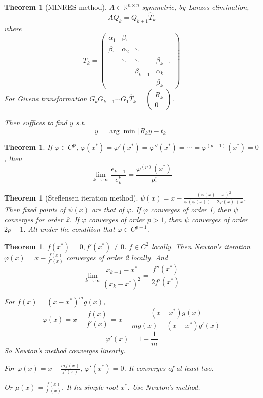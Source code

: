 \documentclass[12pt,b5paper,notitlepage]{article}
\theoremstyle{definition}
\theoremstyle{remark}
\theoremstyle{plain}
\newtheorem{theorem}[definition]{Theorem}
\newcommand{\Rbb}{\mathbb R}
\newcommand{\dps}{\displaystyle}
\numberwithin{equation}{section}
\newcommand{\st}{ \textit{ s.t. }}
\renewcommand{\|}{\Vert}
\begin{document}
\begin{theorem}[MINRES method]
     $ A\in \Rbb^{n\times n} $ symmetric, by Lanzos elimination, 
     \[AQ_k=Q_{k+1}\hat{T}_k\]
     where  
    \[T_k=\begin{pmatrix}
        \alpha_1&\beta_1\\
        \beta_1&\alpha_2&\ddots\\
        &\ddots&\ddots&\beta_{k-1}\\
        &&\beta_{k-1}&\alpha_k\\
        &&&\beta_k
    \end{pmatrix}\] 
     For Givens transformation  $ G_kG_{k-1}\cdots G_1\hat{T}_k=\begin{pmatrix}
        R_k\\
        0
     \end{pmatrix} $.
     
     Then suffices to find  $ y $ \st  
     \[y=\arg\min\|R_ky-t_k\|\]
\end{theorem}
\begin{theorem}
    If  $ \varphi\in C^p $,  $ \varphi(x^*)=\varphi'(x^*)=\varphi''(x^*)=\cdots=\varphi^{(p-1)}(x^*)=0 $, then 
    \[\dps\lim_{k\to\infty}\frac{e_{k+1}}{e_k^p}=\frac{\varphi^{(p)}(x^*)}{p!}\]  
\end{theorem}
\begin{theorem}[Steflensen iteration method]
     $ \psi(x)=x-\dps\frac{(\varphi(x)-x)^2}{\varphi(\varphi(x))-2\varphi(x)+x} $. 
     Then fixed points of $ \psi(x) $ are that of  $ \varphi $. If  $ \varphi $ converges of order 1, then  $ \psi $ converges for order 2. If $ \varphi $ converges of order  $ p>1 $, then  $ \psi $ converges of order  $ 2p-1 $. All under the condition that  $ \varphi\in C^{p+1} $.       
\end{theorem}
\begin{theorem}
     $ f(x^*)=0,f'(x^*)\neq 0 $.  $ f\in C^2 $ locally. Then Newton's iteration  $ \varphi(x)=x-\dps\frac{f(x)}{f'(x)} $
     converges of order 2 locally. And 
     \[\lim_{k\to\infty}\frac{x_{k+1}-x^*}{(x_k-x^*)^2}=\frac{f''(x^*)}{2f'(x^*)}\]   

     For  $ f(x)=(x-x^*)^mg(x) $, 
     \[\varphi(x)=x-\frac{f(x)}{f'(x)}=x-\frac{(x-x^*)g(x)}{mg(x)+(x-x^*)g'(x)}\]
     \[\varphi'(x)=1-\frac{1}{m}\] 
     So Newton's method converges linearly.

     For  $ \varphi(x)=x-\dps\frac{mf(x)}{f'(x)} $,  $ \varphi'(x^*)=0 $. It converges of at least two.
     
     Or  $ \mu(x)=\dps\frac{f(x)}{f'(x)} $. It ha simple root  $ x^* $. Use Newton's method.  
\end{theorem}
\end{document}
